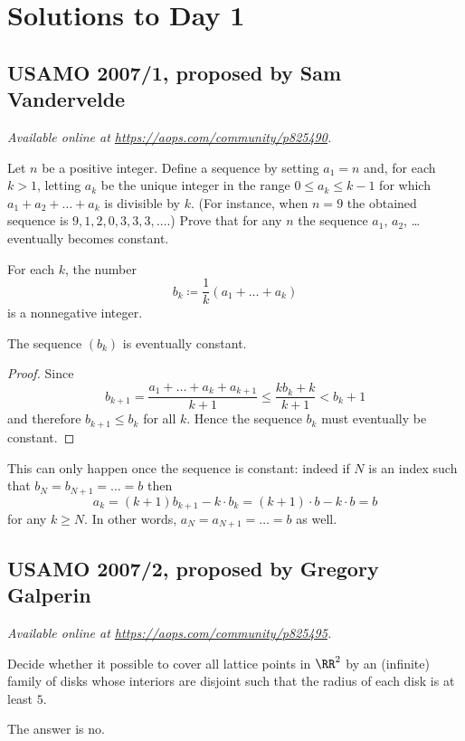 \documentclass[11pt]{scrartcl}
\begin{document}
\section{Solutions to Day 1}
\subsection{USAMO 2007/1, proposed by Sam Vandervelde}
\textsl{Available online at \url{https://aops.com/community/p825490}.}
\begin{mdframed}[style=mdpurplebox,frametitle={Problem statement}]
Let $n$ be a positive integer.
Define a sequence by setting $a_1 = n$ and, for each $k > 1$,
letting $a_k$ be the unique integer in the range $0 \leq a_k \leq k-1$
for which $a_1 + a_2 + \dots + a_k$ is divisible by $k$.
(For instance, when $n = 9$
the obtained sequence is $9,1,2,0,3,3,3,\dots$.)
Prove that for any $n$ the sequence $a_1$, $a_2$, \dots
eventually becomes constant.
\end{mdframed}
For each $k$, the number
\[ b_k \coloneqq \frac 1k (a_1 + \dots + a_k) \]
is a nonnegative integer.
\begin{claim*}
  The sequence $(b_k)$ is eventually constant.
\end{claim*}
\begin{proof}
  Since
  \[ b_{k+1}
    = \frac{a_1 + \dots + a_k + a_{k+1}}{k+1}
    \le \frac{k b_k + k}{k+1} < b_k + 1 \]
  and therefore $b_{k+1} \le b_k$ for all $k$.
  Hence the sequence $b_k$ must eventually be constant.
\end{proof}

This can only happen once the sequence is constant:
indeed if $N$ is an index such that $b_N = b_{N+1} = \dots = b$ then
\[ a_k = (k+1) b_{k+1} - k \cdot b_k
  = (k+1) \cdot b - k \cdot b = b \]
for any $k \ge N$.
In other words, $a_N = a_{N+1} = \dots = b$ as well.
\pagebreak

\subsection{USAMO 2007/2, proposed by Gregory Galperin}
\textsl{Available online at \url{https://aops.com/community/p825495}.}
\begin{mdframed}[style=mdpurplebox,frametitle={Problem statement}]
Decide whether it possible to cover all lattice points in $\RR^2$
by an (infinite) family of disks whose interiors are disjoint
such that the radius of each disk is at least $5$.
\end{mdframed}
The answer is no.
\end{document}
